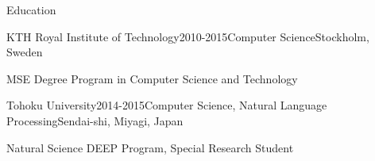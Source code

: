 \documentclass{resume} %
\begin{document}

\begin{rSection}{Education}

\begin{rSubsection}{KTH Royal Institute of Technology}{2010-2015}{Computer Science}{Stockholm, Sweden}
\item MSE Degree Program in Computer Science and Technology
\end{rSubsection}

\begin{rSubsection}{Tohoku University}{2014-2015}{Computer Science, Natural Language Processing}{Sendai-shi, Miyagi, Japan}
\item Natural Science DEEP Program, Special Research Student
\end{rSubsection}

\end{rSection}

\end{document}
